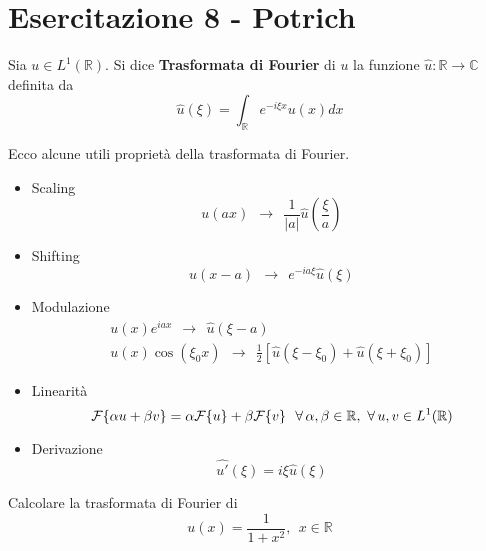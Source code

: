 \chapter{Esercitazione 8 - Potrich}
\ParteEsercizi
\begin{defn}
Sia $u\in L^{1}(\mathbb{R})$. Si dice \textbf{Trasformata di Fourier} di $u$ la funzione $\hat{u} :\mathbb{R}\rightarrow \mathbb{C}$ definita da
\begin{equation*}
\hat{u}( \xi ) =\int _{\mathbb{R}} e^{-i\xi x} u( x) dx
\end{equation*}
\end{defn}
\begin{thm}
[Proprietà] Ecco alcune utili proprietà della trasformata di Fourier.
\begin{itemize}
\item Scaling\begin{equation*}
u( ax) \ \ \rightarrow \ \ \frac{1}{| a| }\hat{u}\left(\frac{\xi }{a}\right)
\end{equation*}
\item Shifting\begin{equation*}
u( x-a) \ \ \rightarrow \ \ e^{-ia\xi }\hat{u}( \xi )
\end{equation*}
\item Modulazione\begin{gather*}
u( x) e^{iax} \ \ \rightarrow \ \ \hat{u}( \xi -a)\\
u( x)\cos( \xi _{0} x) \ \ \rightarrow \ \ \frac{1}{2}[\hat{u}( \xi -\xi _{0}) +\hat{u}( \xi +\xi _{0})]
\end{gather*}
\item Linearità\begin{equation*}
\Fc \{\alpha u+\beta v\} =\alpha \Fc \{u\} +\beta \Fc \{v\} \ \ \forall \alpha ,\beta \in \mathbb{R} ,\ \forall u,v\in L^{1}(\mathbb{R})
\end{equation*}
\item Derivazione\begin{equation*}
\widehat{u'}( \xi ) =i\xi \hat{u}( \xi )
\end{equation*}
\end{itemize}
\end{thm}

Calcolare la trasformata di Fourier di
\begin{equation*}
u( x) =\frac{1}{1+x^{2}} ,\ \ x\in \mathbb{R}
\end{equation*}

